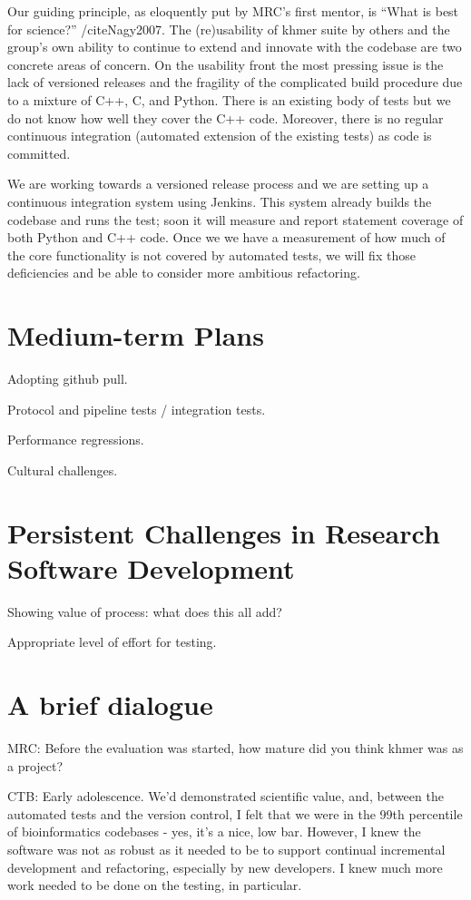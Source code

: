 \documentclass[11pt]{article}
\begin{document}
Our guiding principle, as eloquently put by MRC's first mentor, is
``What is best for science?'' /cite{Nagy2007}. The (re)usability of
khmer suite by others and the group's own ability to continue to
extend and innovate with the codebase are two concrete areas of
concern. On the usability front the most pressing issue is the
lack of versioned releases and the fragility of the complicated build
procedure due to a mixture of C++, C, and Python.  There is an
existing body of tests but we do not know how well they cover the C++
code.  Moreover, there is no regular continuous integration (automated
extension of the existing tests) as code is committed.

We are working towards a versioned release process and we are setting
up a continuous integration system using Jenkins.  This system already
builds the codebase and runs the test; soon it will measure and report
statement coverage of both Python and C++ code.  Once we we have a
measurement of how much of the core functionality is not covered by
automated tests, we will fix those deficiencies and be able to consider
more ambitious refactoring.

\section{Medium-term Plans}

Adopting github pull.

Protocol and pipeline tests / integration tests.

Performance regressions.

Cultural challenges.

\section{Persistent Challenges in Research Software Development}

Showing value of process: what does this all add?

Appropriate level of effort for testing.

\section{A brief dialogue}

MRC: Before the evaluation was started, how mature did you think khmer
was as a project?

CTB: Early adolescence.  We'd demonstrated scientific value, and,
between the automated tests and the version control, I felt that we
were in the 99th percentile of bioinformatics codebases - yes, it's a
nice, low bar.  However, I knew the software was not as robust as it
needed to be to support continual incremental development and
refactoring, especially by new developers.  I knew much more work
needed to be done on the testing, in particular.
\end{document}
